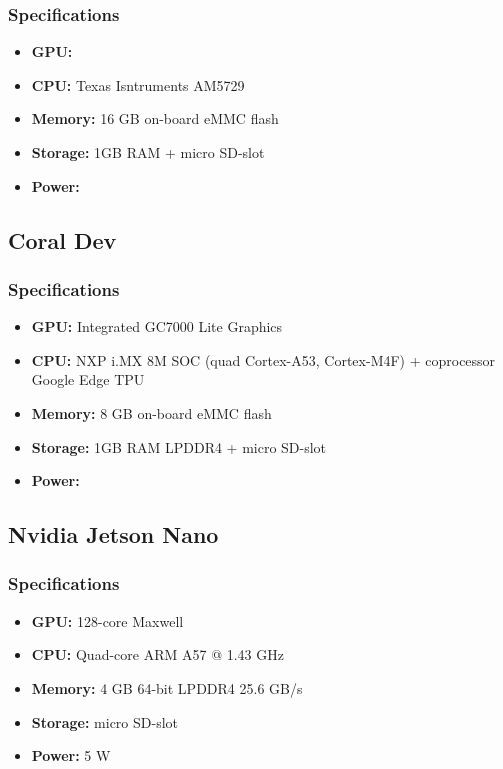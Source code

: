 		\subsubsection{Specifications}
		\begin{itemize}
			\item \textbf{GPU:} 
			\item \textbf{CPU:} Texas Isntruments AM5729
			\item \textbf{Memory:} 16 GB on-board eMMC flash
			\item \textbf{Storage:} 1GB RAM + micro SD-slot
			\item \textbf{Power:}
		\end{itemize}
	
	\subsection{Coral Dev }
		\subsubsection{Specifications}
		\begin{itemize}
			\item \textbf{GPU:} Integrated GC7000 Lite Graphics
			\item \textbf{CPU:} NXP i.MX 8M SOC (quad Cortex-A53, Cortex-M4F) + coprocessor Google Edge TPU
			\item \textbf{Memory:} 8 GB on-board eMMC flash
			\item \textbf{Storage:} 1GB RAM LPDDR4 + micro SD-slot
			\item \textbf{Power:}
		\end{itemize}
	\subsection{Nvidia Jetson Nano}
		\subsubsection{Specifications}
		\begin{itemize}
			\item \textbf{GPU:} 128-core Maxwell
			\item \textbf{CPU:} Quad-core ARM A57 @ 1.43 GHz
			\item \textbf{Memory:} 4 GB 64-bit LPDDR4 25.6 GB/s
			\item \textbf{Storage:}  micro SD-slot
			\item \textbf{Power:} 5 W
		\end{itemize}	
